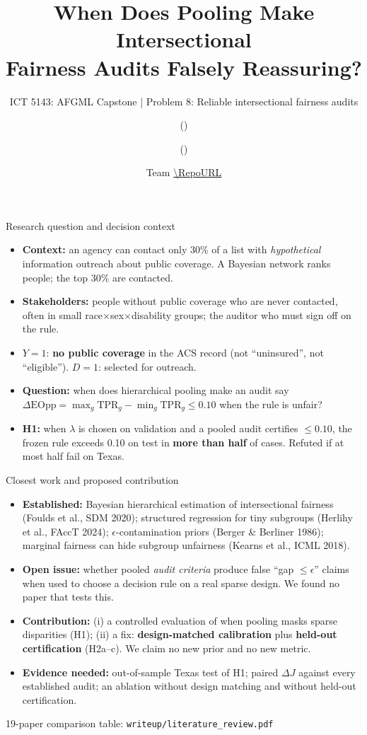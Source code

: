 \documentclass[aspectratio=169,11pt]{beamer}
\title[AFGML Capstone]{When Does Pooling Make Intersectional\\Fairness Audits Falsely Reassuring?}
\subtitle{ICT 5143: AFGML Capstone | Problem 8: Reliable intersectional fairness audits}
\author{\StudentA{} (\RollA) \and \StudentB{} (\RollB)}
\date{Team \TeamID{} \quad\textperiodcentered\quad \url{\RepoURL}\\[2pt]{\scriptsize \EmailA{} \quad \EmailB}}
\begin{document}
\begin{frame}\titlepage\end{frame}

\begin{frame}{Research question and decision context}
\begin{itemize}
\item \textbf{Context:} an agency can contact only 30\% of a list with \emph{hypothetical} information outreach about
  public coverage. A Bayesian network ranks people; the top 30\% are contacted.
\item \textbf{Stakeholders:} people without public coverage who are never contacted, often in small
  race$\times$sex$\times$disability groups; the auditor who must sign off on the rule.
\item $Y=1$: \textbf{no public coverage} in the ACS record (not ``uninsured'', not ``eligible'').
  $D=1$: selected for outreach.
\item \textbf{Question:} when does hierarchical pooling make an audit say
  $\Delta\text{EOpp}=\max_g\text{TPR}_g-\min_g\text{TPR}_g\le0.10$ when the rule is unfair?
\item \textbf{H1:} when $\lambda$ is chosen on validation and a pooled audit certifies $\le0.10$, the frozen rule
  exceeds 0.10 on test in \textbf{more than half} of cases. Refuted if at most half fail on Texas.
\end{itemize}
\end{frame}

\begin{frame}{Closest work and proposed contribution}
\begin{itemize}
\item \textbf{Established:} Bayesian hierarchical estimation of intersectional fairness (Foulds et al., SDM 2020);
  structured regression for tiny subgroups (Herlihy et al., FAccT 2024); $\epsilon$-contamination priors
  (Berger \& Berliner 1986); marginal fairness can hide subgroup unfairness (Kearns et al., ICML 2018).
\item \textbf{Open issue:} whether pooled \emph{audit criteria} produce false ``gap $\le\epsilon$'' claims when
  used to choose a decision rule on a real sparse design. We found no paper that tests this.
\item \textbf{Contribution:} (i) a controlled evaluation of when pooling masks sparse disparities (H1);
  (ii) a fix: \textbf{design-matched calibration} plus \textbf{held-out certification} (H2a--c).
  We claim no new prior and no new metric.
\item \textbf{Evidence needed:} out-of-sample Texas test of H1; paired $\Delta J$ against every established audit;
  an ablation without design matching and without held-out certification.
\end{itemize}
{\footnotesize 19-paper comparison table: \texttt{writeup/literature\_review.pdf}}
\end{frame}
\end{document}
